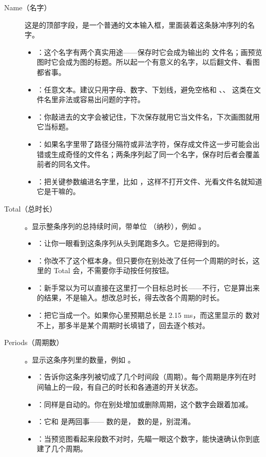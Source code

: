\documentclass[11pt,oneside,openany]{book}
\begin{document}
\begin{description}
\item[Name（名字）] 这是的顶部字段，是一个普通的文本输入框，里面装着这条脉冲序列的名字。
  \begin{itemize}
  \item {}：这个名字有两个真实用途——保存时它会成为输出的  文件名；画预览图时它会成为图的标题。所以起一个有意义的名字，以后翻文件、看图都省事。
  \item {}：任意文本。建议只用字母、数字、下划线，避免空格和 \pyapi{/}、\pyapi{\textbackslash}、\pyapi{:} 这类在文件名里非法或容易出问题的字符。
  \item {}：你敲进去的文字会被记住，下次保存就用它当文件名，下次画图就用它当标题。
  \item {}：如果名字里带了路径分隔符或非法字符，保存成文件这一步可能会出错或生成奇怪的文件名；两条序列起了同一个名字，保存时后者会覆盖前者的同名文件。
  \item {}：把关键参数编进名字里，比如 ，这样不打开文件、光看文件名就知道它是干嘛的。
  \end{itemize}

\item[Total（总时长）] 。显示整条序列的总持续时间，带单位 （纳秒），例如 。
  \begin{itemize}
  \item {}：让你一眼看到这条序列从头到尾跑多久。它是把得到的。
  \item {}：你改不了这个框本身。但只要你在别处改了任何一个周期的时长，这里的 Total 会，不需要你手动按任何按钮。
  \item {}：新手常以为可以直接在这里打一个目标总时长——不行，它是算出来的结果，不是输入。想改总时长，得去改各个周期的时长。
  \item {}：把它当成一个。如果你心里预期总长是 2.15 ms，而这里显示的  数对不上，那多半是某个周期时长填错了，回去逐个核对。
  \end{itemize}

\item[Periods（周期数）] 。显示这条序列里的数量，例如 。
  \begin{itemize}
  \item {}：告诉你这条序列被切成了几个时间段（周期）。每个周期是序列在时间轴上的一段，有自己的时长和各通道的开关状态。
  \item {}：同样是自动的。你在别处增加或删除周期，这个数字会跟着加减。
  \item {}：它和  是两回事—— 数的是， 数的是，别混淆。
  \item {}：当预览图看起来段数不对时，先瞄一眼这个数字，能快速确认你到底建了几个周期。
  \end{itemize}


\end{description}
\end{document}
